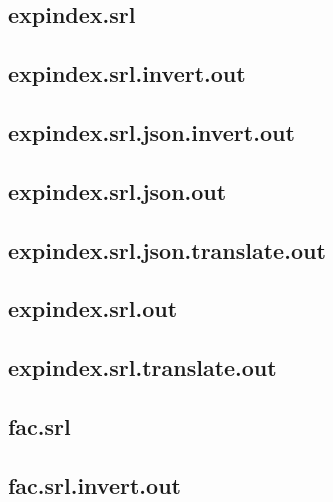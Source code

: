 \subsection{expindex.srl}
\label{app:expindex_srl}

\subsection{expindex.srl.invert.out}
\label{app:expindex_srl.invert.out}

\subsection{expindex.srl.json.invert.out}
\label{app:expindex_srl.json.invert.out}

\subsection{expindex.srl.json.out}
\label{app:expindex_srl.json.out}

\subsection{expindex.srl.json.translate.out}
\label{app:expindex_srl.json.translate.out}

\subsection{expindex.srl.out}
\label{app:expindex_srl.out}

\subsection{expindex.srl.translate.out}
\label{app:expindex_srl.translate.out}

\subsection{fac.srl}
\label{app:fac_srl}

\subsection{fac.srl.invert.out}
\label{app:fac_srl.invert.out}

